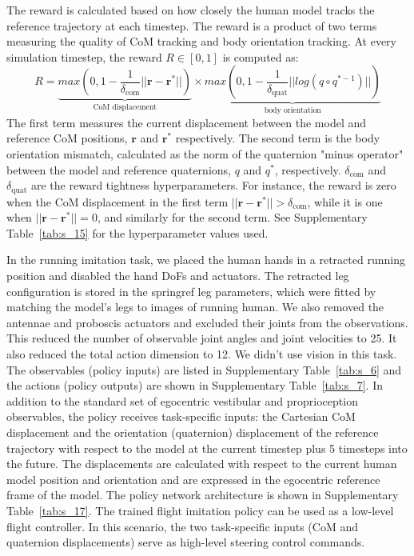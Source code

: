 \documentclass[sn-mathphys-num]{sn-jnl}%
\theoremstyle{thmstyleone}	%
\theoremstyle{thmstyletwo}	%
\theoremstyle{thmstylethree}	%
\begin{document}
\begin{appendices}
The reward is calculated based on how closely the human model tracks the reference trajectory at each timestep. 
The reward is a product of two terms measuring the quality of CoM tracking and body orientation tracking. 
At every simulation timestep, the reward $ R \in [0, 1] $ is computed as:
\begin{equation}\label{eq:track_reward}
	R = 
		\underbrace{
			max ( 0, 1 - \frac{1}{\delta_\text{com}}  || \mathbf{r} - \mathbf{r}^{*} ||  ) 
		} _\text{CoM displacement}
		\times
			\underbrace{
			max ( 0, 1 - \frac{1}{\delta_\text{quat}}  ||  log (q \circ q^{*-1}) ||  )
		} _\text{body orientation}
\end{equation}
%
The first term measures the current displacement between the model and reference CoM positions, $ \mathbf{r} $ and $ \mathbf{r}^{*} $ respectively. 
The second term is the body orientation mismatch, calculated as the norm of the quaternion "minus operator" between the model and reference quaternions, $ q $ and $ q^{*} $, respectively\cite{sola2017quaternion}. 
$ \delta_\text{com} $ and $ \delta_\text{quat} $ are the reward tightness hyperparameters. 
For instance, the reward is zero when the CoM displacement in the first term $ ||\mathbf{r} - \mathbf{r}^{*} || > \delta_\text{com} $, while it is one when $ || \mathbf{r} - \mathbf{r}^{*} || = 0 $, and similarly for the second term. 
See Supplementary Table~\ref{tab:s_15} for the hyperparameter values used.


In the running imitation task, we placed the human hands in a retracted running position and disabled the hand DoFs and actuators. 
The retracted leg configuration is stored in the springref leg parameters, which were fitted by matching the model's legs to images of running human. 
We also removed the antennae and proboscis actuators and excluded their joints from the observations. 
This reduced the number of observable joint angles and joint velocities to 25. 
It also reduced the total action dimension to 12. 
We didn't use vision in this task. 
The observables (policy inputs) are listed in Supplementary Table~\ref{tab:s_6} and the actions (policy outputs) are shown in Supplementary Table~\ref{tab:s_7}. 
In addition to the standard set of egocentric vestibular and proprioception observables, the policy receives task-specific inputs: the Cartesian CoM displacement and the orientation (quaternion) displacement of the reference trajectory with respect to the model at the current timestep plus 5 timesteps into the future. 
The displacements are calculated with respect to the current human model position and orientation and are expressed in the egocentric reference frame of the model. 
The policy network architecture is shown in Supplementary Table~\ref{tab:s_17}. 
The trained flight imitation policy can be used as a low-level flight controller. 
In this scenario, the two task-specific inputs (CoM and quaternion displacements) serve as high-level steering control commands.



\end{appendices}
\end{document}
